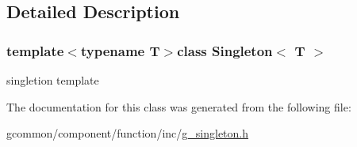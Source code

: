 \subsection{Detailed Description}
\subsubsection*{template$<$typename T$>$class Singleton$<$ T $>$}

singletion template 

The documentation for this class was generated from the following file\-:\begin{DoxyCompactItemize}
\item 
gcommon/component/function/inc/\hyperlink{g__singleton_8h}{g\-\_\-singleton.\-h}\end{DoxyCompactItemize}
